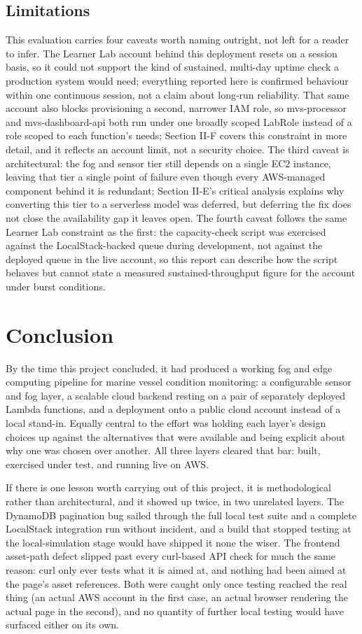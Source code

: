 \documentclass[conference]{IEEEtran}
\begin{document}
\subsection{Limitations}
This evaluation carries four caveats worth naming outright, not left for a reader to infer. The Learner Lab account behind this deployment resets on a session basis, so it could not support the kind of sustained, multi-day uptime check a production system would need; everything reported here is confirmed behaviour within one continuous session, not a claim about long-run reliability. That same account also blocks provisioning a second, narrower IAM role, so mvs-processor and mvs-dashboard-api both run under one broadly scoped LabRole instead of a role scoped to each function's needs; Section II-F covers this constraint in more detail, and it reflects an account limit, not a security choice. The third caveat is architectural: the fog and sensor tier still depends on a single EC2 instance, leaving that tier a single point of failure even though every AWS-managed component behind it is redundant; Section II-E's critical analysis explains why converting this tier to a serverless model was deferred, but deferring the fix does not close the availability gap it leaves open. The fourth caveat follows the same Learner Lab constraint as the first: the capacity-check script was exercised against the LocalStack-backed queue during development, not against the deployed queue in the live account, so this report can describe how the script behaves but cannot state a measured sustained-throughput figure for the account under burst conditions.

\section{Conclusion}
By the time this project concluded, it had produced a working fog and edge computing pipeline for marine vessel condition monitoring: a configurable sensor and fog layer, a scalable cloud backend resting on a pair of separately deployed Lambda functions, and a deployment onto a public cloud account instead of a local stand-in. Equally central to the effort was holding each layer's design choices up against the alternatives that were available and being explicit about why one was chosen over another. All three layers cleared that bar: built, exercised under test, and running live on AWS.

If there is one lesson worth carrying out of this project, it is methodological rather than architectural, and it showed up twice, in two unrelated layers. The DynamoDB pagination bug sailed through the full local test suite and a complete LocalStack integration run without incident, and a build that stopped testing at the local-simulation stage would have shipped it none the wiser. The frontend asset-path defect slipped past every curl-based API check for much the same reason: curl only ever tests what it is aimed at, and nothing had been aimed at the page's asset references. Both were caught only once testing reached the real thing (an actual AWS account in the first case, an actual browser rendering the actual page in the second), and no quantity of further local testing would have surfaced either on its own.
\end{document}
